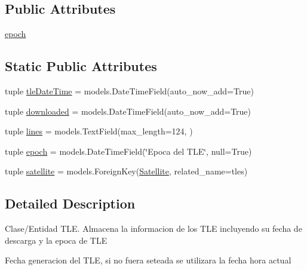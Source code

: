 \subsection*{Public Attributes}
\begin{DoxyCompactItemize}
\item 
\hyperlink{class_ground_segment_1_1models_1_1_tle_1_1_tle_ad99155dd9e68ea90cdfe8d44cf1ac897}{epoch}
\end{DoxyCompactItemize}
\subsection*{Static Public Attributes}
\begin{DoxyCompactItemize}
\item 
tuple \hyperlink{class_ground_segment_1_1models_1_1_tle_1_1_tle_a66ec63c8a5d9f0a43b9aa48993e531a6}{tle\+Date\+Time} = models.\+Date\+Time\+Field(auto\+\_\+now\+\_\+add=True)
\item 
tuple \hyperlink{class_ground_segment_1_1models_1_1_tle_1_1_tle_ae3785c68a686c40d0505afe276d13d04}{downloaded} = models.\+Date\+Time\+Field(auto\+\_\+now\+\_\+add=True)
\item 
tuple \hyperlink{class_ground_segment_1_1models_1_1_tle_1_1_tle_ac5a4980b37f61f042cb30d0a268755eb}{lines} = models.\+Text\+Field(max\+\_\+length=124, )
\item 
tuple \hyperlink{class_ground_segment_1_1models_1_1_tle_1_1_tle_adbe4180b2b304b13ec62581aca377ffa}{epoch} = models.\+Date\+Time\+Field(\char`\"{}Epoca del T\+L\+E\char`\"{}, null=True)
\item 
tuple \hyperlink{class_ground_segment_1_1models_1_1_tle_1_1_tle_a95bfe88e371279e78d31945379bd3785}{satellite} = models.\+Foreign\+Key(\hyperlink{class_ground_segment_1_1models_1_1_satellite_1_1_satellite}{Satellite}, related\+\_\+name=\textquotesingle{}tles\textquotesingle{})
\end{DoxyCompactItemize}


\subsection{Detailed Description}
\begin{DoxyVerb}Clase/Entidad TLE.
Almacena la informacion de los TLE incluyendo su fecha de descarga y la epoca de TLE 
\end{DoxyVerb}
\begin{DoxyVerb}Fecha generacion del TLE, si no fuera seteada se utilizara la fecha hora actual
\end{DoxyVerb}
 

